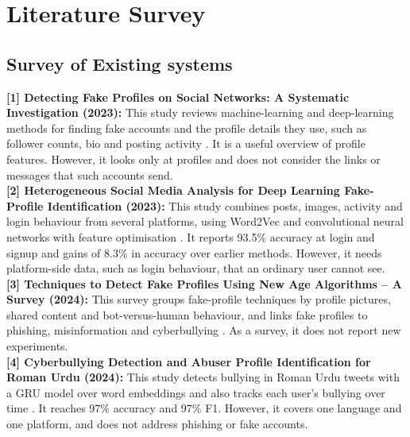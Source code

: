 \onehalfspacing
\pagestyle{fancy}
\fancyhf{}
\renewcommand{\headrulewidth}{0pt}
\cfoot{\thepage}
\chapter{Literature Survey}

\section{Survey of Existing systems}
\noindent\textbf{[1] Detecting Fake Profiles on Social Networks: A Systematic Investigation (2023):} This study reviews machine-learning and deep-learning methods for finding fake accounts and the profile details they use, such as follower counts, bio and posting activity \cite{lit1}. It is a useful overview of profile features. However, it looks only at profiles and does not consider the links or messages that such accounts send.\\

\noindent\textbf{[2] Heterogeneous Social Media Analysis for Deep Learning Fake-Profile Identification (2023):} This study combines posts, images, activity and login behaviour from several platforms, using Word2Vec and convolutional neural networks with feature optimisation \cite{lit2}. It reports 93.5\% accuracy at login and signup and gains of 8.3\% in accuracy over earlier methods. However, it needs platform-side data, such as login behaviour, that an ordinary user cannot see.\\

\noindent\textbf{[3] Techniques to Detect Fake Profiles Using New Age Algorithms -- A Survey (2024):} This survey groups fake-profile techniques by profile pictures, shared content and bot-versus-human behaviour, and links fake profiles to phishing, misinformation and cyberbullying \cite{lit3}. As a survey, it does not report new experiments.\\

\noindent\textbf{[4] Cyberbullying Detection and Abuser Profile Identification for Roman Urdu (2024):} This study detects bullying in Roman Urdu tweets with a GRU model over word embeddings and also tracks each user's bullying over time \cite{lit4}. It reaches 97\% accuracy and 97\% F1. However, it covers one language and one platform, and does not address phishing or fake accounts.\\

